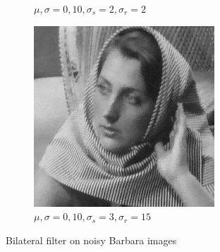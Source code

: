 \documentclass[a4paper, landscape]{article}
\begin{document}
\begin{figure}
\begin{subfigure}{0.33\linewidth}
        \caption{$\mu, \sigma = 0, 10, \sigma_s=2, \sigma_r=2$}
    \end{subfigure}
    \begin{subfigure}{0.33\linewidth}
        \centering
        \includegraphics[width=\linewidth]{barbara256,σ_noise10,σ_spatial3,σ_range15.png}
        \caption{$\mu, \sigma = 0, 10, \sigma_s=3, \sigma_r=15$}
    \end{subfigure}
    \caption{Bilateral filter on noisy Barbara images}
    \label{fig:bn}
\end{figure}
\end{document}
